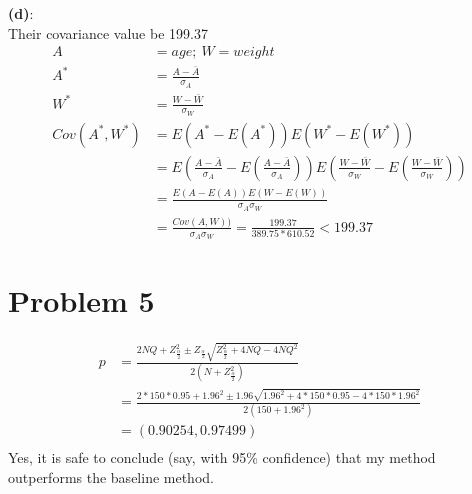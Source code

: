 \documentclass[11pt]{scrartcl}
\begin{document}
\textbf{(d)}:\\
Their covariance value be  199.37
\begin{equation*}
\begin{aligned}
A&=age;\   
W=weight\\
A^*&=\frac{A- \bar{A}}{\sigma_A}\\
W^*&=\frac{W- \bar{W}}{\sigma_W}\\
Cov(A^*,W^*)
&=E(A^*-E(A^*))E(W^*-E(W^*))\\
&=E(\frac{A- \bar{A}}{\sigma_A}-E(\frac{A- \bar{A}}{\sigma_A}))E(\frac{W- \bar{W}}{\sigma_W}-E(\frac{W- \bar{W}}{\sigma_W}))\\
&=\frac{E(A-E(A))E(W-E(W))}{\sigma_A \sigma_W}\\
&=\frac{Cov(A,W))}{\sigma_A \sigma_W}
=\frac{199.37}{389.75 *610.52}<199.37
\end{aligned}
\end{equation*}
\section*{Problem 5}
\begin{equation*}
\begin{aligned}
p
&=\frac{2NQ+Z_{\frac{\alpha}{2}}^{2}
		\pm Z_{\frac{\alpha}{2}}
		\sqrt
			{
			Z_{\frac{\alpha}{2}}^{2}+4NQ-4NQ^2
			}
	}
	{2(N+Z_{\frac{\alpha}{2}}^{2})}\\
&=\frac{2*150*0.95+1.96^2
		\pm 1.96
		\sqrt
			{
			1.96^2+4*150*0.95-4*150*1.96^2
			}
	}
	{2(150+1.96^2)}\\
&=(0.90254,0.97499)\\
\end{aligned}
\end{equation*}
Yes, it is safe to conclude (say, with 95\% confidence) that my method outperforms the baseline method.
\end{document}
